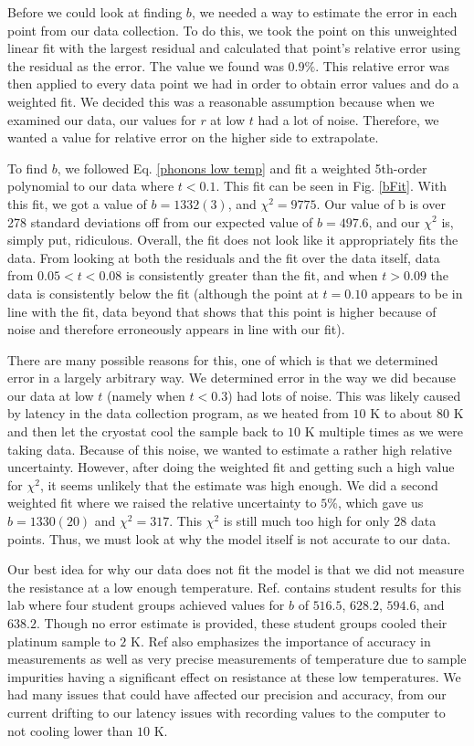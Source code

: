 \documentclass[11pt,letterpaper]{article}
\begin{document}
Before we could look at finding $b$, we needed a way to estimate the error in each point from our data collection. To do this, we took the point on this unweighted linear fit with the largest residual and calculated that point's relative error using the residual as the error. The value we found was $0.9\%$. This relative error was then applied to every data point we had in order to obtain error values and do a weighted fit. We decided this was a reasonable assumption because when we examined our data, our values for $r$ at low $t$ had a lot of noise. Therefore, we wanted a value for relative error on the higher side to extrapolate.

To find $b$, we followed Eq. \ref{phonons low temp} and fit a weighted 5th-order polynomial to our data where $t < 0.1$. This fit can be seen in Fig. \ref{bFit}. With this fit, we got a value of $b = 1332(3)$, and $\chi^2 = 9775$. Our value of b is over 278 standard deviations off from our expected value of $b = 497.6$, and our $\chi^2$ is, simply put, ridiculous. Overall, the fit does not look like it appropriately fits the data. From looking at both the residuals and the fit over the data itself, data from $0.05 < t < 0.08$ is consistently greater than the fit, and when $t > 0.09$ the data is consistently below the fit (although the point at $t = 0.10$ appears to be in line with the fit, data beyond that shows that this point is higher because of noise and therefore erroneously appears in line with our fit). 

There are many possible reasons for this, one of which is that we determined error in a largely arbitrary way. We determined error in the way we did because our data at low $t$ (namely when $t < 0.3$) had lots of noise. This was likely caused by latency in the data collection program, as we heated from $10$ K to about $80$ K and then let the cryostat cool the sample back to $10$ K multiple times as we were taking data. Because of this noise, we wanted to estimate a rather high relative uncertainty. However, after doing the weighted fit and getting such a high value for $\chi^2$, it seems unlikely that the estimate was high enough. We did a second weighted fit where we raised the relative uncertainty to $5\%$, which gave us $b = 1330(20)$ and $\chi^2 = 317$. This $\chi^2$ is still much too high for only 28 data points. Thus, we must look at why the model itself is not accurate to our data.


Our best idea for why our data does not fit the model is that we did not measure the resistance at a low enough temperature. Ref. \cite{Thomas} contains student results for this lab where four student groups achieved values for $b$ of $516.5$, $628.2$, $594.6$, and $638.2$. Though no error estimate is provided, these student groups cooled their platinum sample to $2$ K. Ref \cite{Thomas} also emphasizes the importance of accuracy in measurements as well as very precise measurements of temperature due to sample impurities having a significant effect on resistance at these low temperatures. We had many issues that could have affected our precision and accuracy, from our current drifting to our latency issues with recording values to the computer to not cooling lower than $10$ K.
\end{document}
